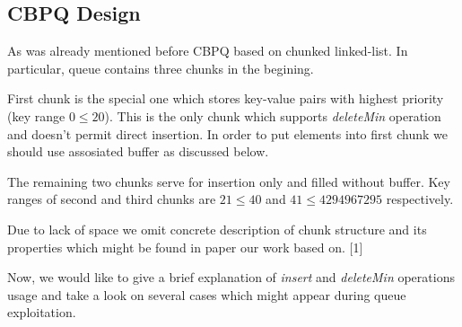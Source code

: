 \documentclass{article}
\begin{document}
\subsection{CBPQ Design}\mbox{}\par
As was already mentioned before CBPQ based on chunked linked-list. In particular, queue contains three chunks in the begining.\par
First chunk is the special one which stores key-value pairs with highest priority (key range $0 \leqslant 20$). This is the only chunk which supports \textit{deleteMin} operation and doesn't permit direct insertion. In order to put elements into first chunk we should use assosiated buffer as discussed below.\par
The remaining two chunks serve for insertion only and filled without buffer. Key ranges of second and third chunks are $21 \leqslant 40$ and $41 \leqslant 4294967295$ respectively.\par
Due to lack of space we omit concrete description of chunk structure and its properties which might be found in paper our work based on. [1]\par
Now, we would like to give a brief explanation of \textit{insert} and \textit{deleteMin} operations usage and take a look on several cases which might appear during queue exploitation.
\end{document}
